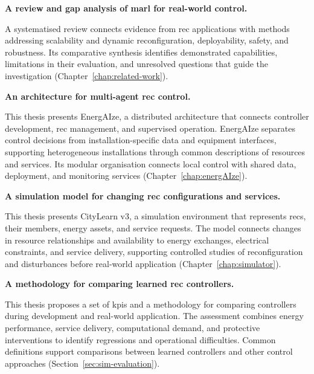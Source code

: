 \begin{description}[leftmargin=3.6em,labelwidth=3em,labelsep=0.6em,align=left,font=\normalfont\bfseries,itemsep=0.55\baselineskip,parsep=0pt,topsep=0.5\baselineskip]
\item[SC1] \textbf{A review and gap analysis of \gls{marl} for real-world control.}\par\nobreak
A systematised review connects evidence from \gls{rec} applications with methods addressing scalability and dynamic reconfiguration, deployability, safety, and robustness. Its comparative synthesis identifies demonstrated capabilities, limitations in their evaluation, and unresolved questions that guide the investigation (Chapter~\ref{chap:related-work}).

\item[SC2] \textbf{An architecture for multi-agent \gls{rec} control.}\par\nobreak
This thesis presents EnergAIze, a distributed architecture that connects controller development, \gls{rec} management, and supervised operation. EnergAIze separates control decisions from installation-specific data and equipment interfaces, supporting heterogeneous installations through common descriptions of resources and services. Its modular organisation connects local control with shared data, deployment, and monitoring services (Chapter~\ref{chap:energAIze}).

\item[SC3] \textbf{A simulation model for changing \gls{rec} configurations and services.}\par\nobreak
This thesis presents CityLearn v3, a simulation environment that represents \glspl{rec}, their members, energy assets, and service requests. The model connects changes in resource relationships and availability to energy exchanges, electrical constraints, and service delivery, supporting controlled studies of reconfiguration and disturbances before real-world application (Chapter~\ref{chap:simulator}).

\item[SC4] \textbf{A methodology for comparing learned \gls{rec} controllers.}\par\nobreak
This thesis proposes a set of \glspl{kpi} and a methodology for comparing controllers during development and real-world application. The assessment combines energy performance, service delivery, computational demand, and protective interventions to identify regressions and operational difficulties. Common definitions support comparisons between learned controllers and other control approaches (Section~\ref{sec:sim-evaluation}).


\end{description}
